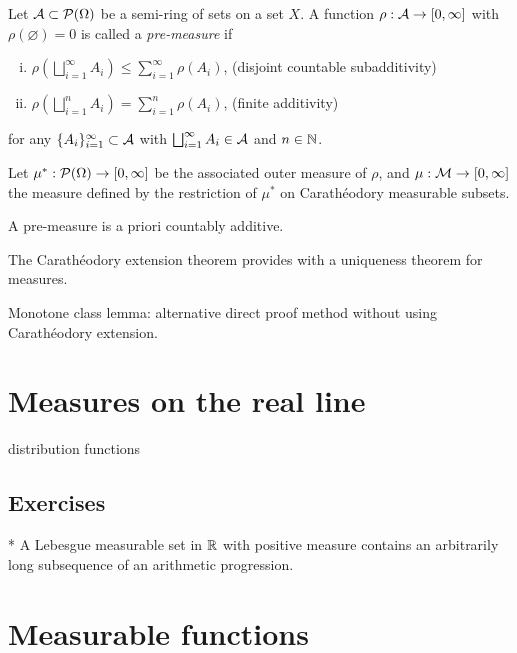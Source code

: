 \documentclass{../note}
\begin{document}
\begin{prb}
Let $\mathcal{A}\subset\mathcal{P}(\Omega)$ be a semi-ring of sets on a set $X$.
A function $\rho:\mathcal{A}\to[0,\infty]$ with $\rho(\varnothing)=0$ is called a \emph{pre-measure} if
\begin{enumerate}[(i)]
\item $\rho(\bigsqcup_{i=1}^\infty A_i)\le\sum_{i=1}^\infty\rho(A_i)$,
\hfill(disjoint countable subadditivity)
\item $\rho(\bigsqcup_{i=1}^nA_i)=\sum_{i=1}^n\rho(A_i)$,
\hfill(finite additivity)
\end{enumerate}
for any $\{A_i\}_{i=1}^\infty\subset\mathcal{A}$ with $\bigsqcup_{i=1}^\infty A_i\in\mathcal{A}$ and $n\in\mathbb{N}$.

Let $\mu^*:\mathcal{P}(\Omega)\to[0,\infty]$ be the associated outer measure of $\rho$, and $\mu:\mathcal{M}\to[0,\infty]$ the measure defined by the restriction of $\mu^*$ on Carath\'eodory measurable subsets.
\begin{parts}
\item A pre-measure is a priori countably additive.
\end{parts}
\end{prb}



\begin{prb}
The Carath\'eodory extension theorem provides with a uniqueness theorem for measures.
\end{prb}



Monotone class lemma: alternative direct proof method without using Carath\'eodory extension.


\chapter{Measures on the real line}

distribution functions


\section*{Exercises}
\begin{prb}*
A Lebesgue measurable set in $\mathbb{R}$ with positive measure contains an arbitrarily long subsequence of an arithmetic progression.
\end{prb}


\chapter{Measurable functions}
\end{document}
